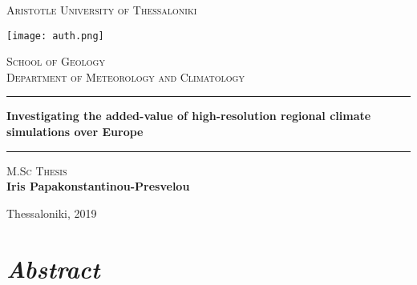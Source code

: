 \documentclass[greek,12pt]{report}
\begin{document}
\begin{titlepage}
  \begin{center}
  
    \vspace*{.01\textheight}
    {\scshape\LARGE Aristotle University of Thessaloniki \par}%
    \texttt{[image: auth.png]} %
    \par
    \textsc{\Large School of Geology\\ \vspace{0.3cm}Department of Meteorology and Climatology} 
    \vspace{1cm}
    \hrule \vspace{0.5cm}
    {\Large \bfseries Investigating the added-value of high-resolution regional climate simulations over Europe \par}\vspace{0.7cm} %
    \hrule \vspace{1.5cm} %
    
    \textsc{\large M.Sc Thesis}\\[1.5cm] %
    {\large \bfseries Iris Papakonstantinou-Presvelou} 
    \vspace{4cm}
    
    {\large Thessaloniki, 2019}%
    
  \end{center}
\end{titlepage}

\newpage

\chapter*{\textsl{Abstract}} \thispagestyle{empty}
\end{document}

